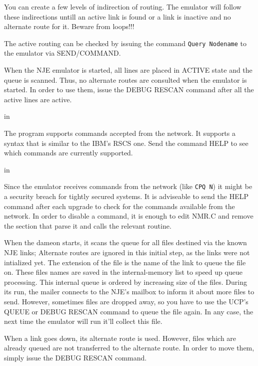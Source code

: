You can create a few levels of indirection of routing.  The  emulator
will  follow these indirections untill an active link is found or a link
is inactive and no alternate route for it. {\ncrBold Beware from loops!!!}

The  active  routing  can  be  checked   by   issuing   the   command
{\tt Query Nodename} to the emulator via SEND/COMMAND.

When  the  NJE  emulator  is  started, all lines are placed in ACTIVE
state and the queue is scanned. Thus, no alternate routes are  consulted
when  the  emulator  is  started.  In  order  to  use  them,  issue  the
DEBUG RESCAN command after all the active lines are active.

 in

The program supports commands accepted from the network. It  supports
a syntax that is similar to the IBM's RSCS one. Send the command HELP to
see which commands are currently supported.

 in

Since the emulator receives commands from the network (like {\tt CPQ N}) it
might be a security breach for tightly secured systems. It is adviseable
to send the HELP command after each upgrade to check  for  the  commands
available  from the network. In order to disable a command, it is enough
to edit NMR.C and remove  the  section  that  parse  it  and  calls  the
relevant routine.

\vfill\eject


When the dameon starts, it scans the queue for all files destined via
the known NJE links; Alternate routes are ignored in this initial  step,
as  the  links were not intialized yet. The extension of the file is the
name of the link to queue the file on. These files names  are  saved  in
the  internal-memory  list  to  speed up queue processing. This internal
queue is ordered by increasing size of the files. During  its  run,  the
mailer  connects  to  the NJE's mailbox to inform it about more files to
send. However, sometimes files are dropped away, so you have to use  the
UCP's  QUEUE  or  DEBUG RESCAN  command  to queue the file again. In any
case, the next time the emulator will run it'll collect this file.

When a link goes down, its alternate route is  used.  However,  files
which  are already queued are not transferred to the alternate route. In
order to move them, simply issue the DEBUG RESCAN command.

